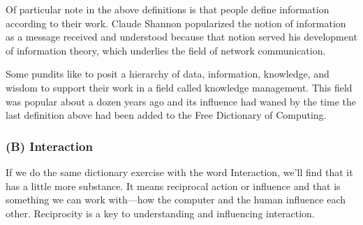 \begin{Shaded}
\begin{Highlighting}[]





\end{Highlighting}
\end{Shaded}

\normalsize

Of particular note in the above definitions is that people define
information according to their work. Claude Shannon popularized the
notion of information as a message received and understood because that
notion served his development of information theory, which underlies the
field of network communication.

Some pundits like to posit a hierarchy of data, information, knowledge,
and wisdom to support their work in a field called knowledge management.
This field was popular about a dozen years ago and its influence had
waned by the time the last definition above had been added to the Free
Dictionary of Computing.

\hypertarget{b-interaction}{%
\subsubsection{(B) Interaction}\label{b-interaction}}

If we do the same dictionary exercise with the word Interaction, we'll
find that it has a little more substance. It means reciprocal action or
influence and that is something we can work with---how the computer and
the human influence each other. Reciprocity is a key to understanding
and influencing interaction.

